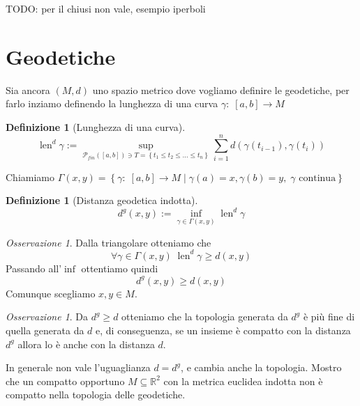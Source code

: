 \documentclass[a4paper,10pt]{article}
\newcounter{counter1}
\theoremstyle{plain}
\theoremstyle{definition}
\newtheorem{mydef}[counter1]{Definizione}
\theoremstyle{remark}
\newtheorem{myoss}[counter1]{Osservazione}
\newcommand{\set}[1]{\left\{#1\right\}}
\newcommand{\pa}[1]{\left(#1\right)}
\newcommand{\bra}[1]{\left[#1\right]}
\DeclareMathOperator{\len}{len}
\begin{document}
TODO: per il chiusi non vale, esempio iperboli


\section{Geodetiche}

Sia ancora $(M,d)$ uno spazio metrico dove vogliamo definire le
geodetiche, per farlo inziamo definendo la lunghezza di una curva
$\gamma :\; \bra{a,b} \to M$
\begin{mydef}[Lunghezza di una curva]
  \[ \len^d \gamma := \sup _{\mathcal{P}_{fin}(\bra{a,b}) \ni T =
    \set{t_1 \le t_2 \le ... \le t_n}} \sum_{i=1}^n d\pa{
    \gamma\pa{t_{i-1}}, \gamma\pa{t_i}} \]
\end{mydef}

Chiamiamo $\Gamma (x,y) = \set{\gamma:\; \bra{a,b} \to M \mid
  \gamma(a) = x, \gamma(b) = y,\; \gamma \text{ continua}}$

\begin{mydef}[Distanza geodetica indotta]
  \[ d^g (x,y) := \inf _{\gamma \in \Gamma(x,y)} \len^d \gamma \]
\end{mydef}

\begin{myoss}
  Dalla triangolare otteniamo che 
  \[ \forall \gamma \in \Gamma(x,y) \; \len^d \gamma \ge d(x,y) \]
  Passando all'$\inf$ ottentiamo quindi
  \[ d^g(x,y) \ge d(x,y) \]
  Comunque scegliamo $x,y \in M$.
\end{myoss}

\begin{myoss}
\label{oss:topologiagedoeticafine}
  Da $d^g \ge d$ otteniamo che la topologia generata da $d^g$ è più
  fine di quella generata da $d$ e, di conseguenza, se un insieme è
  compatto con la distanza $d^g$ allora lo è anche con la distanza
  $d$.
\end{myoss}

In generale non vale l'uguaglianza $d = d^g$, e cambia anche la
topologia. Mostro che un compatto opportuno $M \subseteq \mathbb{R}^2$
con la metrica euclidea indotta non è compatto nella topologia delle
geodetiche.
\end{document}
